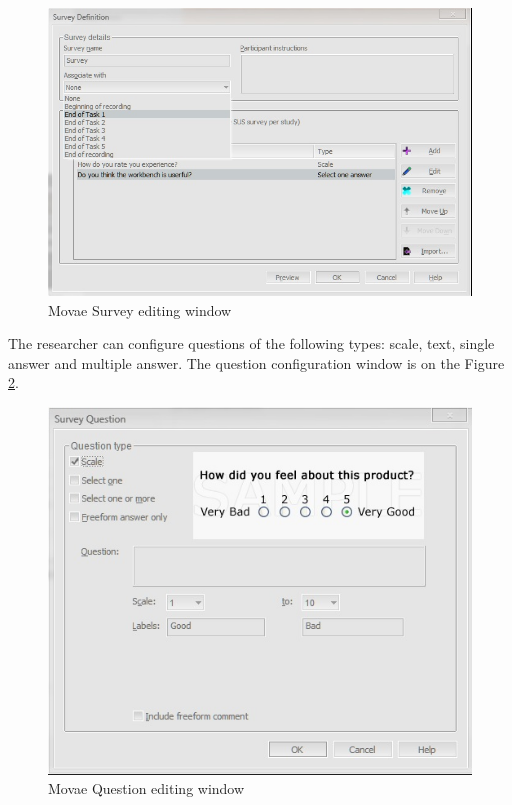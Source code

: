     \begin{figure}[htb]
 \centering
\includegraphics[width=\textwidth]{figures/movae_surveys_1.jpg}
\caption{Movae Survey editing window}
\label{fig:movae_survey_1}
 \end{figure}
 
 The researcher can configure questions of the following types: scale, text, single answer and multiple answer. The question configuration window is on the Figure \ref{fig:movae_survey_2}.\\
 
     \begin{figure}[htb]
 \centering
\includegraphics{figures/movae_surveys_2.jpg}
\caption{Movae Question editing window}
\label{fig:movae_survey_2}
 \end{figure}
 
